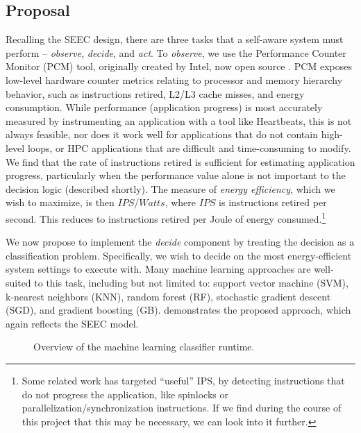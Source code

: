 \subsection{Proposal}

Recalling the SEEC design, there are three tasks that a self-aware system must perform -- \emph{observe}, \emph{decide}, and \emph{act}.
To \emph{observe}, we use the Performance Counter Monitor (PCM) tool, originally created by Intel, now open source \cite{PCMGit}.
PCM exposes low-level hardware counter metrics relating to processor and memory hierarchy behavior, such as instructions retired, L2/L3 cache misses, and energy consumption.
While performance (\ie application progress) is most accurately measured by instrumenting an application with a tool like Heartbeats, this is not always feasible, nor does it work well for applications that do not contain high-level loops, or HPC applications that are difficult and time-consuming to modify.
We find that the rate of instructions retired is sufficient for estimating application progress, particularly when the performance value alone is not important to the decision logic (described shortly).
The measure of \emph{energy efficiency}, which we wish to maximize, is then $IPS / Watts$, where $IPS$ is instructions retired per second.
This reduces to instructions retired per Joule of energy consumed.\footnote{Some related work has targeted ``useful'' IPS, by detecting instructions that do not progress the application, like spinlocks or parallelization/synchronization instructions. If we find during the course of this project that this may be necessary, we can look into it further.}

We now propose to implement the \emph{decide} component by treating the decision as a classification problem.
Specifically, we wish to decide on the most energy-efficient system settings to execute with.
Many machine learning approaches are well-suited to this task, including but not limited to: support vector machine (SVM), k-nearest neighbors (KNN), random forest (RF), stochastic gradient descent (SGD), and gradient boosting (GB).
 demonstrates the proposed approach, which again reflects the SEEC model.

\begin{figure}[t]
  \begin{centering}
    
    \caption{Overview of the machine learning classifier runtime.}
    \label{fig:classifier-runtime}
  \end{centering}
\end{figure}

